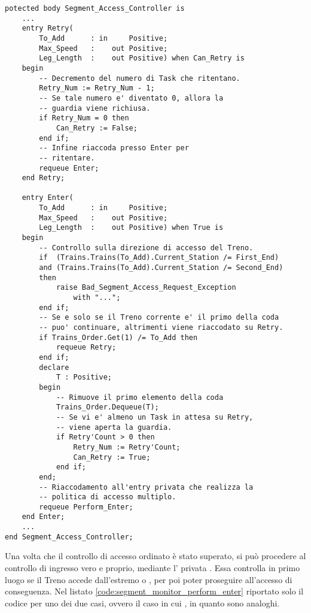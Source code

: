 \begin{lstlisting}[caption=\small{Meccanismo che garantisce accesso ordinato secondo l'ordine sancito da \ttt{Trains\_Order}.},label=code:impl_segment_monitor_enter]
potected body Segment_Access_Controller is
	...
	entry Retry(
		To_Add      : in     Positive;
		Max_Speed   :    out Positive;
		Leg_Length  :    out Positive) when Can_Retry is
	begin
		-- Decremento del numero di Task che ritentano.
		Retry_Num := Retry_Num - 1;
		-- Se tale numero e' diventato 0, allora la 
		-- guardia viene richiusa.
		if Retry_Num = 0 then
			Can_Retry := False;
		end if;
		-- Infine riaccoda presso Enter per 
		-- ritentare.
		requeue Enter;
	end Retry;
	
	entry Enter(
		To_Add      : in     Positive;
		Max_Speed   : 	 out Positive;
		Leg_Length  :    out Positive) when True is
	begin
		-- Controllo sulla direzione di accesso del Treno.
		if  (Trains.Trains(To_Add).Current_Station /= First_End) 
		and (Trains.Trains(To_Add).Current_Station /= Second_End) 
		then
			raise Bad_Segment_Access_Request_Exception 
				with "...";
		end if;
		-- Se e solo se il Treno corrente e' il primo della coda 
		-- puo' continuare, altrimenti viene riaccodato su Retry.
		if Trains_Order.Get(1) /= To_Add then
			requeue Retry;
		end if;
		declare
			T : Positive;
		begin
			-- Rimuove il primo elemento della coda
			Trains_Order.Dequeue(T);
			-- Se vi e' almeno un Task in attesa su Retry,
			-- viene aperta la guardia.
			if Retry'Count > 0 then
				Retry_Num := Retry'Count;
				Can_Retry := True;
			end if;
		end;
		-- Riaccodamento all'entry privata che realizza la
		-- politica di accesso multiplo.
		requeue Perform_Enter;
	end Enter;
	...
end Segment_Access_Controller;
\end{lstlisting}

Una volta che il controllo di accesso ordinato è stato superato, si può procedere al controllo di ingresso vero e proprio, mediante l' privata . Essa controlla in primo luogo se il Treno accede dall'estremo  o , per poi poter proseguire all'accesso di conseguenza. Nel listato \ref{code:segment_monitor_perform_enter} riportato solo il codice per uno dei due casi, ovvero il caso in cui , in quanto sono analoghi. 

